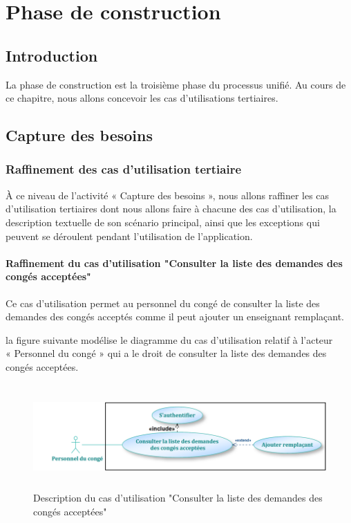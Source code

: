 \documentclass[12 pt ]{report}
\begin{document}
\chapter{Phase de construction}
\section*{Introduction}  
La phase de construction est la troisième phase du processus unifié. Au cours de ce chapitre, nous allons concevoir les cas d’utilisations tertiaires.
\section{Capture des besoins}
\subsection{Raffinement des cas d’utilisation tertiaire}
À ce niveau de l’activité « Capture des besoins », nous allons raffiner les cas d'utilisation tertiaires dont nous allons faire à chacune des cas d'utilisation, la description textuelle de son scénario principal, ainsi que les exceptions qui peuvent se déroulent pendant l'utilisation de l’application.
\subsubsection{Raffinement du cas d'utilisation "Consulter la liste des demandes des congés acceptées"}
Ce cas d'utilisation permet au personnel du congé de consulter la liste des demandes des congés acceptés comme il peut ajouter un enseignant remplaçant.
\newpage

la figure suivante modélise le diagramme du cas d’utilisation  relatif à l’acteur \\« Personnel du congé » qui a le droit de consulter la liste des demandes des congés acceptées.

\begin{figure}[h]
\begin{center}
\includegraphics[width= 13cm , height = 4cm]{aj_rem.png}
\caption{Description du cas d'utilisation "Consulter la liste des demandes des congés acceptées"}
\end{center}
\end{figure}
\end{document}
